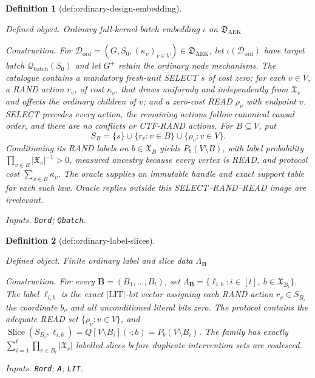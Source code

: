 \documentclass{article}
\newtheorem{definition}{Definition}
\begin{document}
\begin{definition}[def:ordinary-design-embedding]\label{def:ordinary-design-embedding}
\par\smallskip\noindent\emph{Defined object.} Ordinary full-kernel batch embedding \(\iota\) on \(\mathfrak D_{\mathrm{AEK}}\)
\par\smallskip\noindent\emph{Construction.} For \(\mathcal D_{\mathrm{ord}}=(G,S_0,(\kappa_v)_{v\in V})\in\mathfrak D_{\mathrm{AEK}}\), let \(\iota(\mathcal D_{\mathrm{ord}})\) have target batch \(\mathcal Q_{\mathrm{batch}}(S_0)\) and let \(G^{+}\) retain the ordinary node mechanisms.  The catalogue contains a mandatory fresh-unit SELECT \(s\) of cost zero; for each \(v\in V\), a RAND action \(r_v\), of cost \(\kappa_v\), that draws uniformly and independently from \(\mathfrak X_v\) and affects the ordinary children of \(v\); and a zero-cost READ \(\rho_v\) with endpoint \(v\).  SELECT precedes every action, the remaining actions follow canonical causal order, and there are no conflicts or CTF-RAND actions.  For \(B\subseteq V\), put
\[
 S_B=\{s\}\cup\{r_v:v\in B\}\cup\{\rho_v:v\in V\}.
\]
Conditioning its RAND labels on \(b\in\mathfrak X_B\) yields \(P_b(V\setminus B)\), with label probability \(\prod_{v\in B}|\mathfrak X_v|^{-1}>0\), measured ancestry because every vertex is READ, and protocol cost \(\sum_{v\in B}\kappa_v\).  The oracle supplies an immutable handle and exact support table for each such law.  Oracle replies outside this SELECT--RAND--READ image are irrelevant.
\par\smallskip\noindent\emph{Inputs.} \texttt{Dord}; \texttt{Qbatch}.
\end{definition}

\begin{definition}[def:ordinary-label-slices]\label{def:ordinary-label-slices}
\par\smallskip\noindent\emph{Defined object.} Finite ordinary label and slice data \(\Lambda_{\mathbf B}\)
\par\smallskip\noindent\emph{Construction.} For every \(\mathbf B=(B_1,\ldots,B_t)\), set \(\Lambda_{\mathbf B}=\{\ell_{i,b}:i\in[t],\ b\in\mathfrak X_{B_i}\}\). The label \(\ell_{i,b}\) is the exact \(|\mathrm{LIT}|\)-bit vector assigning each RAND action \(r_v\in S_{B_i}\) the coordinate \(b_v\) and all unconditioned literal bits zero. The protocol contains the adequate READ set \(\{\rho_v:v\in V\}\), and \(\operatorname{Slice}(S_{B_i},\ell_{i,b})=Q[V\setminus B_i](\cdot;b)=P_b(V\setminus B_i)\). The family has exactly \(\sum_{i=1}^{t}\prod_{v\in B_i}|\mathfrak X_v|\) labelled slices before duplicate intervention sets are coalesced.
\par\smallskip\noindent\emph{Inputs.} \texttt{Bord}; \texttt{A}; \texttt{LIT}.
\end{definition}
\end{document}
